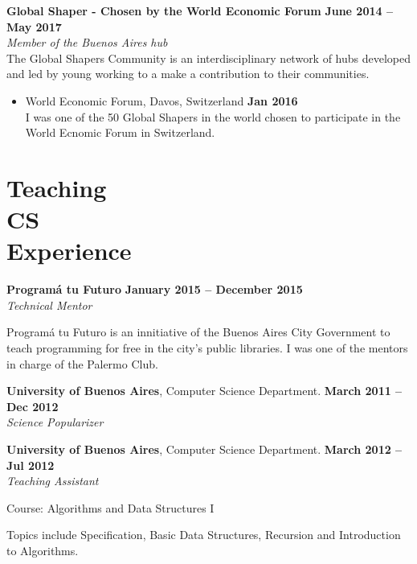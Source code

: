 \documentclass[margin,line]{resume}
\begin{document}
\begin{resume}
\textbf{Global Shaper - Chosen by the World Economic Forum} \hfill \textbf{June 2014 -- May 2017} \vspace{2mm}\\\vspace{1mm}
\textsl{Member of the Buenos Aires hub} \\
The Global Shapers Community is an interdisciplinary network of hubs developed and led by young working to a make a contribution to their communities.

\begin{itemize}
\item  World Economic Forum, Davos, Switzerland \hfill \textbf{Jan 2016} \vspace{2mm} \\
I was one of the 50 Global Shapers in the world chosen to participate in the World Ecnomic Forum in Switzerland.

\end{itemize}



\section{\mysidestyle Teaching\\CS\\Experience}

\textbf{Program\'a tu Futuro} \hfill \textbf{January 2015 --  December 2015}
\\
\textsl{Technical Mentor} \hfill 
\begin{list2}
	\item Program\'a tu Futuro is an innitiative of the Buenos Aires City Government to teach programming for free in the city's public libraries. I was one of the mentors in charge of the Palermo Club.
\end{list2}\vspace{-1.5mm}

\textbf{University of Buenos Aires}, Computer Science Department. \hfill \textbf{March 2011 --  Dec 2012}
\\
\textsl{Science Popularizer} \hfill 

\textbf{University of Buenos Aires}, Computer Science Department. \hfill \textbf{March 2012 --  Jul 2012}
\\
\textsl{Teaching Assistant} \hfill
\begin{list2}
	\item Course: Algorithms and Data Structures I
	\item Topics include Specification, Basic Data Structures, Recursion and Introduction to Algorithms.
\end{list2}\vspace{-1.5mm}


\end{resume}
\end{document}
